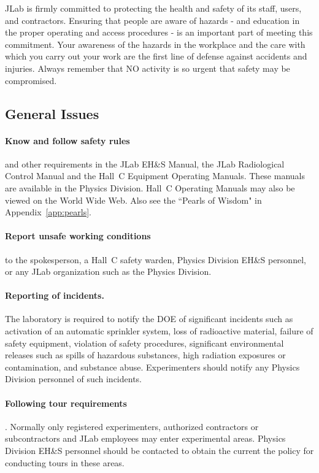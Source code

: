 JLab is firmly committed to protecting the health and safety of its
staff, users, and
contractors. Ensuring that people are aware of hazards - and education in
the proper operating
and access procedures - is an important part of meeting this commitment.
Your awareness of
the hazards in the workplace and the care with which you carry out your
work are the first line
of defense against accidents and injuries. Always remember that NO activity
is so urgent that
safety may be compromised.

\subsection{General Issues}


\paragraph{Know and follow safety rules} and other requirements in the JLab
EH\&S
Manual, the JLab Radiological Control Manual and the Hall~C Equipment
Operating
Manuals. These manuals are available in the Physics Division. Hall~C
Operating Manuals may
also be viewed on the World Wide Web. Also see the ``Pearls of Wisdom" in
Appendix~\ref{app:pearls}.


\paragraph{Report unsafe working conditions} to the spokesperson, a Hall~C safety
warden,
Physics Division EH\&S personnel, or any JLab organization such as the
Physics Division.


\paragraph{Reporting of incidents.}   The laboratory is required to notify the DOE of
significant
incidents such as activation of an automatic sprinkler system, loss of
radioactive material, failure
of safety equipment, violation of safety procedures, significant
environmental releases such as
spills of hazardous substances, high radiation exposures or contamination,
and substance abuse.
Experimenters should notify any Physics Division personnel of such incidents.


\paragraph{Following tour requirements}.  Normally only registered experimenters,
authorized
contractors or subcontractors and JLab employees may enter experimental
areas. Physics
Division EH\&S personnel should be contacted to obtain the current the
policy for conducting
tours in these areas.

